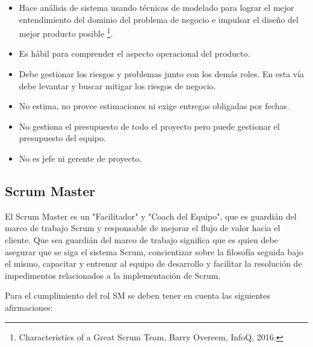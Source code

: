 \begin{itemize}
\item Hace análisis de sistema usando técnicas de modelado para lograr el mejor entendimiento del dominio del problema de negocio e impulsar el diseño del mejor producto posible \footnote{Characteristics of a Great Scrum Team, Barry Overeem, InfoQ, 2016.}.
\item Es hábil para comprender el aspecto operacional del producto.
\item Debe gestionar los riesgos y problemas junto con los demás roles. En esta vía debe levantar y buscar mitigar los riesgos de negocio.
\item No estima, no provee estimaciones ni exige entregas obligadas por fechas.
\item No gestiona el presupuesto de todo el proyecto pero puede gestionar el presupuesto del equipo.
\item No es jefe ni gerente de proyecto.
\end{itemize}

\subsection{Scrum Master}

El Scrum Master es un "Facilitador" y "Coach del Equipo", que es guardián del marco de trabajo Scrum y responsable de mejorar el flujo de valor hacia el cliente. Que sea guardián del marco de trabajo significa que es quien debe asegurar que se siga el sistema Scrum, concientizar sobre la filosofía seguida bajo el mismo, capacitar y entrenar al equipo de desarrollo y facilitar la resolución de impedimentos relacionados a la implementación de Scrum.

Para el cumplimiento del rol SM se deben tener en cuenta las siguientes afirmaciones:

